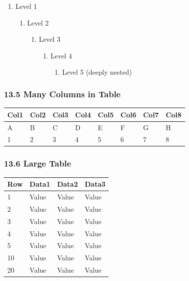 \documentclass{article}
\begin{document}
\begin{enumerate}
\item  Level 1
\begin{enumerate}
\item  Level 2
\begin{enumerate}
\item  Level 3
\begin{enumerate}
\item  Level 4
\begin{enumerate}
\item  Level 5 (deeply nested)
\end{enumerate}


\end{enumerate}


\end{enumerate}


\end{enumerate}


\end{enumerate}

\subsubsection{ 13.5 Many Columns in Table}

\begin{tabular}{llllllll}
\hline
 Col1  &  Col2  &  Col3  &  Col4  &  Col5  &  Col6  &  Col7  &  Col8  \\
\hline
 A  &  B  &  C  &  D  &  E  &  F  &  G  &  H  \\
 1  &  2  &  3  &  4  &  5  &  6  &  7  &  8  \\
\hline
\end{tabular}

\subsubsection{ 13.6 Large Table}

\begin{tabular}{llll}
\hline
 Row  &  Data1  &  Data2  &  Data3  \\
\hline
 1  &  Value  &  Value  &  Value  \\
 2  &  Value  &  Value  &  Value  \\
 3  &  Value  &  Value  &  Value  \\
 4  &  Value  &  Value  &  Value  \\
 5  &  Value  &  Value  &  Value  \\
 10  &  Value  &  Value  &  Value  \\
 20  &  Value  &  Value  &  Value  \\
\hline
\end{tabular}
\end{document}
